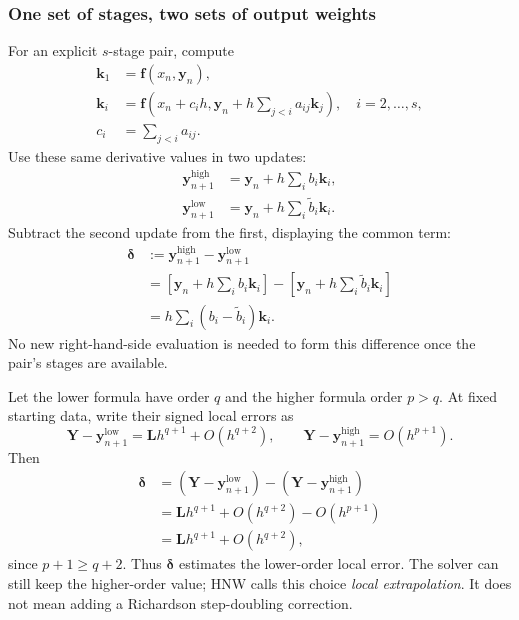 \subsubsection{One set of stages, two sets of output weights}
For an explicit $s$-stage pair, compute
\begin{equation}\label{Eq:AdaptSharedStages}
\begin{aligned}
 \mathbf k_1&=\mathbf f(x_n,\mathbf y_n),\\
 \mathbf k_i&=\mathbf f\!\left(x_n+c_i h,
       \mathbf y_n+h\sum_{j<i}a_{ij}\mathbf k_j\right),
       \quad i=2,\ldots,s,\\
 c_i&=\sum_{j<i}a_{ij}.
\end{aligned}
\end{equation}
Use these same derivative values in two updates:
\begin{equation}\label{Eq:AdaptTwoOutputs}
\begin{aligned}
 \mathbf y_{n+1}^{\mathrm{high}}
 &=\mathbf y_n+h\sum_i b_i\mathbf k_i,\\
 \mathbf y_{n+1}^{\mathrm{low}}
 &=\mathbf y_n+h\sum_i\widetilde b_i\mathbf k_i.
\end{aligned}
\end{equation}
Subtract the second update from the first, displaying the common term:
\begin{equation}\label{Eq:AdaptDifference}
\begin{aligned}
 \boldsymbol\delta
 &:=\mathbf y_{n+1}^{\mathrm{high}}-\mathbf y_{n+1}^{\mathrm{low}}\\
 &=\left[\mathbf y_n+h\sum_i b_i\mathbf k_i\right]
   -\left[\mathbf y_n+h\sum_i\widetilde b_i\mathbf k_i\right]\\
 &=h\sum_i(b_i-\widetilde b_i)\mathbf k_i.
\end{aligned}
\end{equation}
No new right-hand-side evaluation is needed to form this difference once the
pair's stages are available.

Let the lower formula have order $q$ and the higher formula order $p>q$.
At fixed starting data, write their signed local errors as
\[
 \mathbf Y-\mathbf y_{n+1}^{\mathrm{low}}
   =\mathbf L h^{q+1}+O(h^{q+2}),\qquad
 \mathbf Y-\mathbf y_{n+1}^{\mathrm{high}}=O(h^{p+1}).
\]
Then
\begin{equation}\label{Eq:AdaptEstimatedOrder}
\begin{aligned}
 \boldsymbol\delta
 &=(\mathbf Y-\mathbf y_{n+1}^{\mathrm{low}})
    -(\mathbf Y-\mathbf y_{n+1}^{\mathrm{high}})\\
 &=\mathbf L h^{q+1}+O(h^{q+2})-O(h^{p+1})\\
 &=\mathbf L h^{q+1}+O(h^{q+2}),
\end{aligned}
\end{equation}
since $p+1\geq q+2$. Thus $\boldsymbol\delta$ estimates the lower-order
local error. The solver can still keep the higher-order value; HNW calls
this choice \emph{local extrapolation}. It does not mean adding a Richardson
step-doubling correction.

